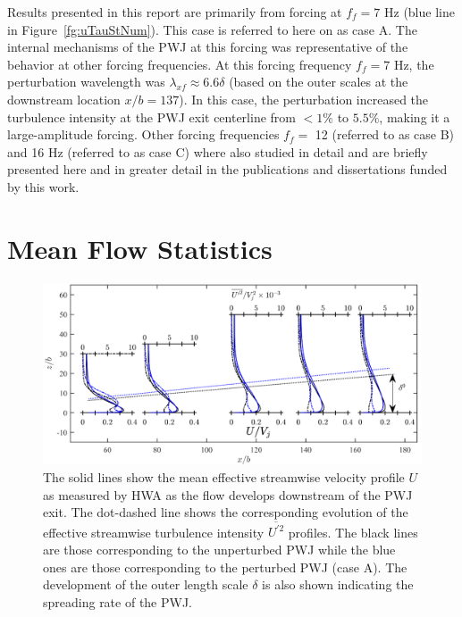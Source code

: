 Results presented in this report are primarily from forcing at $f_f=7$ Hz (blue line in Figure~\ref{fg:uTauStNum}). This case is referred to here on as case A. The internal mechanisms of the PWJ at this forcing was representative of the behavior at other forcing frequencies. At this forcing frequency $f_f=7$ Hz, the perturbation wavelength was $\lambda_{xf}\approx 6.6 \delta$ (based on the outer scales at the downstream location $x/b=137$). In this case, the perturbation increased the turbulence intensity at the PWJ exit centerline from $<1\%$ to $5.5\%$, making it a large-amplitude forcing. Other forcing frequencies $f_f=$ 12 (referred to as case B) and 16 Hz (referred to as case C) where also studied in detail and are briefly presented here and in greater detail in the publications and dissertations funded by this work. 

\section{Mean Flow Statistics}

\begin{figure}[H]
	\centering
	\includegraphics[width=.95\textwidth]{pics/meanVelTurbInt.png}
	\caption{The solid lines show the mean effective streamwise velocity profile ${U}$ as measured by HWA as the flow develops downstream of the PWJ exit. The dot-dashed line shows the corresponding evolution of the effective streamwise turbulence intensity $\overline{U^{\prime2}}$ profiles. The black lines are those corresponding to the unperturbed PWJ while the blue ones are those corresponding to the perturbed PWJ (case A). The development of the outer length scale $\delta$ is also shown indicating the spreading rate of the PWJ.}
	\label{fg:meanVelTurbInt}
\end{figure}

